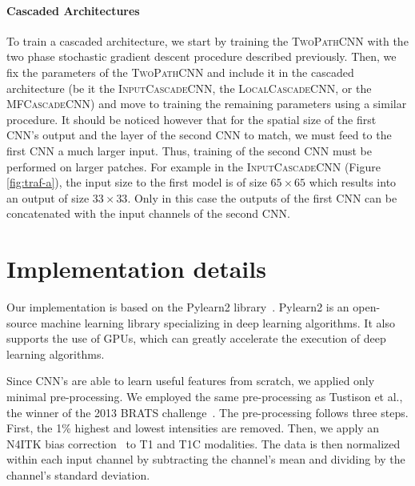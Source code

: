 \documentclass[final,5p,times,twocolumn]{elsarticle}
\newcommand{\HL}[1]{\textcolor{red}{\small{}[\textbf{Hugo:} #1]}}
\newcommand{\MH}[1]{\textcolor{purple}{\small{}[\textbf{Mohammad:} #1]}}
\newcommand{\PMJ}[1]{\textcolor{green}{\small{}[\textbf{Pierre-Marc:} #1]}}
\begin{document}
\paragraph{Cascaded Architectures}



To train a cascaded architecture, we start by training the \textsc{TwoPathCNN} with the two phase stochastic gradient descent procedure described previously. Then, we fix the parameters of the \textsc{TwoPathCNN} and include it in the cascaded architecture (be it the \textsc{InputCascadeCNN}, the \textsc{LocalCascadeCNN}, or the \textsc{MFCascadeCNN}) and move to training the remaining parameters using a similar procedure. It should be noticed however that for the spatial size of the first CNN's output and the layer of the second CNN to match, we must feed to the first CNN a much larger input. Thus, training of the second CNN must be performed on larger patches. For example in the \textsc{InputCascadeCNN} (Figure \ref{fig:traf-a}), the input size to the first model is of size $65\times65$ which results into an output of size $33\times33$. Only in this case the outputs of the first CNN can be concatenated with the input channels of the second CNN. 





\section{Implementation details}

\label{sec:implementation}



Our implementation is based on the Pylearn2 library~\citep{pylearn2_arxiv_2013}. Pylearn2 is an open-source machine learning library specializing in deep learning algorithms. It also supports the use of GPUs, which can greatly accelerate the execution of deep learning algorithms.



Since CNN's are able to learn useful features from scratch, we applied only minimal pre-processing. We  employed the same pre-processing as Tustison et al., the winner of the 2013 BRATS challenge~\citep{Menze2014}. The pre-processing follows three steps. First, the 1\% highest and lowest intensities are removed. Then, we apply an N4ITK bias correction~\citep{avants2009advanced} to T1 and T1C modalities. 
The data is then normalized within each input channel by subtracting the channel's mean and dividing by the channel's standard deviation.
\end{document}
